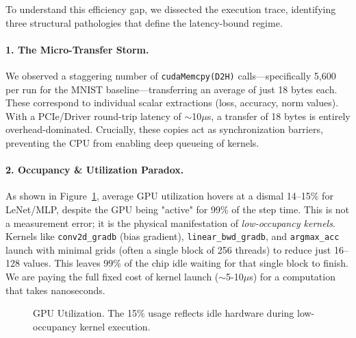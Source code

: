 \documentclass[10pt,twocolumn,letterpaper]{article}
\begin{document}
To understand this efficiency gap, we dissected the execution trace, identifying three structural pathologies that define the latency-bound regime.

\paragraph{1. The Micro-Transfer Storm.}
We observed a staggering number of \texttt{cudaMemcpy(D2H)} calls---specifically 5,600 per run for the MNIST baseline---transferring an average of just 18 bytes each.
These correspond to individual scalar extractions (loss, accuracy, norm values).
With a PCIe/Driver round-trip latency of $\sim$10$\mu$s, a transfer of 18 bytes is entirely overhead-dominated.
Crucially, these copies act as synchronization barriers, preventing the CPU from enabling deep queueing of kernels.

\paragraph{2. Occupancy \& Utilization Paradox.}
As shown in Figure~\ref{fig:gpuutil}, average GPU utilization hovers at a dismal 14--15\% for LeNet/MLP, despite the GPU being "active" for 99\% of the step time.
This is not a measurement error; it is the physical manifestation of \emph{low-occupancy kernels}.
Kernels like \texttt{conv2d\_gradb} (bias gradient), \texttt{linear\_bwd\_gradb}, and \texttt{argmax\_acc} launch with minimal grids (often a single block of 256 threads) to reduce just 16--128 values.
This leaves 99\% of the chip idle waiting for that single block to finish.
We are paying the full fixed cost of kernel launch ($\sim$5-10$\mu$s) for a computation that takes nanoseconds.

\begin{figure}[H]
\centering
{}
\caption{GPU Utilization. The 15\% usage reflects idle hardware during low-occupancy kernel execution.}
\label{fig:gpuutil}
\end{figure}
\end{document}
